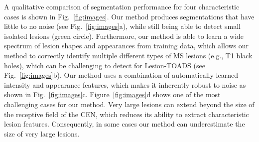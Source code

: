 

A qualitative comparison of segmentation performance for four characteristic
cases is shown in Fig.~\ref{fig:images}. Our method produces segmentations that
have little to no noise (see Fig.~\ref{fig:images}a), while still being able to
detect small isolated lesions (green circle). Furthermore, our method is able to
learn a wide spectrum of lesion shapes and appearances from training data, which
allows our method to correctly identify multiple different types of MS lesions
(e.g., T1 black holes), which can be challenging to detect for Lesion-TOADS (see
Fig.~\ref{fig:images}b). Our method uses a combination of automatically learned
intensity and appearance features, which makes it inherently robust to noise as
shown in Fig.~\ref{fig:images}c. Figure~\ref{fig:images}d shows one of the most
challenging cases for our method. Very large lesions can extend beyond the size
of the receptive field of the CEN, which reduces its ability to extract
characteristic lesion features. Consequently, in some cases our method can
underestimate the size of very large lesions.

